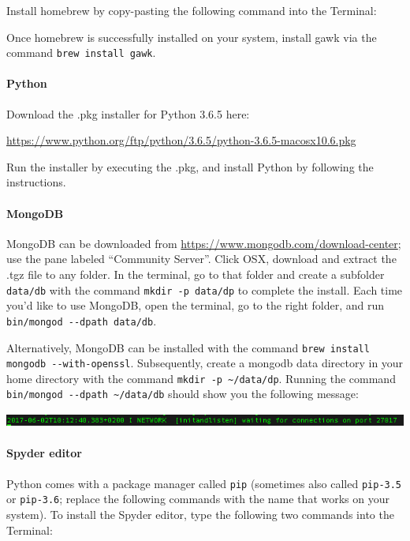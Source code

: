 \documentclass[a4paper]{report}
\begin{document}
Install homebrew by copy-pasting the following command into the
Terminal:



Once homebrew is successfully installed on your system, install gawk via the command {\small\texttt{brew install gawk}}.

\paragraph{Python}
Download the .pkg installer for Python 3.6.5 here:

\url{https://www.python.org/ftp/python/3.6.5/python-3.6.5-macosx10.6.pkg}

Run the installer by executing the .pkg, and install Python by following
the instructions.

\paragraph{MongoDB}
MongoDB can be downloaded from
\url{https://www.mongodb.com/download-center}; use the pane labeled
``Community Server''. Click OSX, download and
extract the .tgz file to any folder. In the terminal, go to that folder
and create a subfolder {\small\texttt{data/db}} with the command {\small\texttt{mkdir
-p data/dp}} to complete the install. Each time you{\textquoteright}d
like to use MongoDB, open the terminal, go to the right folder, and run
{\small\texttt{bin/mongod -{}-dpath data/db}}.

Alternatively, MongoDB can be installed with the command {\small\texttt{brew
install mongodb -{}-with-openssl}}. Subsequently, create a mongodb data
directory in your home directory with the command {\small\texttt{mkdir -p
\~{}/data/dp}}. Running the command {\small\texttt{bin/mongod -{}-dpath
\~{}/data/db}} should show you the following message:

\noindent\includegraphics[width=6.4953in,height=0.1783in]{Syllabus-img6.png} 

\paragraph{Spyder editor}
Python comes with a package manager called {\small\texttt{pip}} (sometimes also
called {\small\texttt{pip-3.5}} or {\small\texttt{pip-3.6}}; replace the following commands with
the name that works on your system). To install the Spyder editor,
type the following two commands into the Terminal: 
\end{document}
